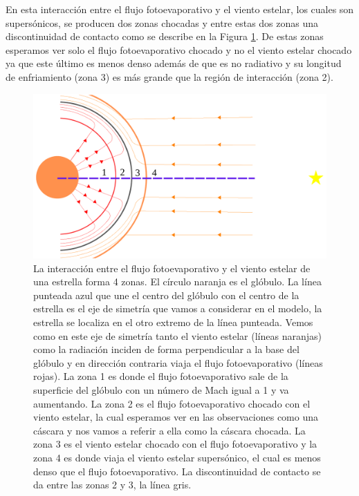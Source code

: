 \documentclass{book}
\begin{document}
En esta interacción entre el flujo fotoevaporativo y el viento
estelar, los cuales son supersónicos, se producen dos zonas chocadas y
entre estas dos zonas una discontinuidad de contacto como se describe
en la Figura \ref{fig:zones}. De estas zonas esperamos ver solo el
flujo fotoevaporativo chocado y no el viento estelar chocado ya que
este último es menos denso además de que es no radiativo y su longitud
de enfriamiento (zona 3) es más grande que la región de interacción
(zona 2).

\begin{figure}[htb]
    \centering    \includegraphics[width=\textwidth]{imagenes_corregidas/Arreglo 01.pdf}
    \caption{La interacción entre el flujo fotoevaporativo y el viento
      estelar de una estrella forma 4 zonas. El círculo naranja es el
      glóbulo. La línea punteada azul que une el centro del glóbulo
      con el centro de la estrella es el eje de simetría que vamos a
      considerar en el modelo, la estrella se localiza en el otro
      extremo de la línea punteada. Vemos como en este eje de simetría
      tanto el viento estelar (líneas naranjas) como la radiación
      inciden de forma perpendicular a la base del glóbulo y en
      dirección contraria viaja el flujo fotoevaporativo (líneas
      rojas). La zona 1 es donde el flujo fotoevaporativo sale de la
      superficie del glóbulo con un número de Mach igual a 1 y va
      aumentando. La zona 2 es el flujo fotoevaporativo chocado con el
      viento estelar, la cual esperamos ver en las observaciones como
      una cáscara y nos vamos a referir a ella como la cáscara
      chocada. La zona 3 es el viento estelar chocado con el flujo
      fotoevaporativo y la zona 4 es donde viaja el viento estelar
      supersónico, el cual es menos denso que el flujo
      fotoevaporativo. La discontinuidad de contacto se da entre las
      zonas 2 y 3, la línea gris.}
    \label{fig:zones}
\end{figure}
\end{document}
